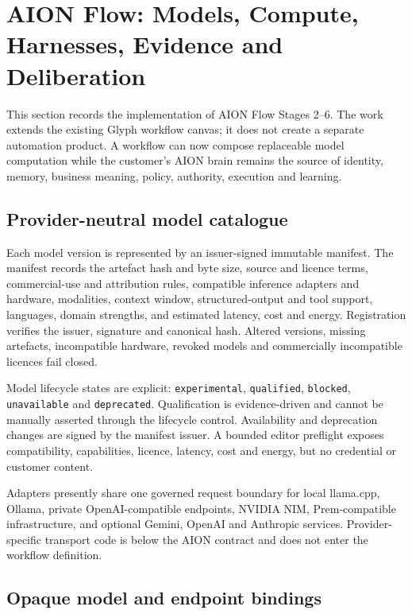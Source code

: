 \section{AION Flow: Models, Compute, Harnesses, Evidence and Deliberation}
\label{sec:aion-flow-intelligence-runtime}

This section records the implementation of AION Flow Stages 2--6.  The work extends the existing
Glyph workflow canvas; it does not create a separate automation product.  A workflow can now
compose replaceable model computation while the customer's AION brain remains the source of
identity, memory, business meaning, policy, authority, execution and learning.

\subsection{Provider-neutral model catalogue}

Each model version is represented by an issuer-signed immutable manifest.  The manifest records
the artefact hash and byte size, source and licence terms, commercial-use and attribution rules,
compatible inference adapters and hardware, modalities, context window, structured-output and
tool support, languages, domain strengths, and estimated latency, cost and energy.  Registration
verifies the issuer, signature and canonical hash.  Altered versions, missing artefacts, incompatible
hardware, revoked models and commercially incompatible licences fail closed.

Model lifecycle states are explicit: \texttt{experimental}, \texttt{qualified}, \texttt{blocked},
\texttt{unavailable} and \texttt{deprecated}.  Qualification is evidence-driven and cannot be
manually asserted through the lifecycle control.  Availability and deprecation changes are signed
by the manifest issuer.  A bounded editor preflight exposes compatibility, capabilities, licence,
latency, cost and energy, but no credential or customer content.

Adapters presently share one governed request boundary for local llama.cpp, Ollama, private
OpenAI-compatible endpoints, NVIDIA NIM, Prem-compatible infrastructure, and optional Gemini,
OpenAI and Anthropic services.  Provider-specific transport code is below the AION contract and
does not enter the workflow definition.

\subsection{Opaque model and endpoint bindings}

